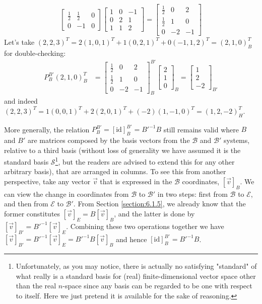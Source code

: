 \begin{solution}
\begin{align*}
\begin{bmatrix}
\frac{1}{2} & \frac{1}{2} & 0 \\
0 & -1 & 0
\end{bmatrix}
\begin{bmatrix}
1 & 0 & -1\\
0 & 2 & 1 \\
1 & 1 & 2
\end{bmatrix}
=
\begin{bmatrix}
\frac{1}{2} & 0 & 2 \\
\frac{1}{2} & 1 & 0 \\
0 & -2 & -1
\end{bmatrix}
\end{align*}
Let's take $(2,2,3)^T = 2(1,0,1)^T + 1(0,2,1)^T + 0(-1,1,2)^T = (2,1,0)^T_B$ for double-checking:
\begin{align*}
P_B^{B'}(2,1,0)^T_B &= 
\begin{bmatrix}
\frac{1}{2} & 0 & 2 \\
\frac{1}{2} & 1 & 0 \\
0 & -2 & -1
\end{bmatrix}_B^{B'}
\begin{bmatrix}
2 \\
1 \\
0
\end{bmatrix}_B
=
\begin{bmatrix}
1 \\
2 \\
-2
\end{bmatrix}_{B'}
\end{align*}
and indeed $(2,2,3)^T = 1(0,0,1)^T + 2(2,0,1)^T + (-2)(1,-1,0)^T = (1,2,-2)^T_H$.
\end{solution}
More generally, the relation $P_B^{B'} = [\text{id}]_B^{B'} = B'^{-1}B$ still remains valid where $B$ and $B'$ are matrices composed by the basis vectors from the $\mathcal{B}$ and $\mathcal{B}'$ systems, relative to a third basis (without loss of generality we have assumed it is the standard basis $\mathcal{S}$\footnote{Unfortunately, as you may notice, there is actually no satisfying "standard" of what really is a standard basis for (real) finite-dimensional vector space other than the real $n$-space since any basis can be regarded to be one with respect to itself. Here we just pretend it is available for the sake of reasoning.}, but the readers are advised to extend this for any other arbitrary basis), that are arranged in columns. To see this from another perspective, take any vector $\vec{v}$ that is expressed in the $\mathcal{B}$ coordinates, $[\vec{v}]_B$. We can view the change in coordinates from $\mathcal{B}$ to $\mathcal{B}'$ in two steps: first from $\mathcal{B}$ to $\mathcal{E}$, and then from $\mathcal{E}$ to $\mathcal{B}'$. From Section \ref{section:6.1.5}, we already know that the former constitutes $[\vec{v}]_E = B[\vec{v}]_B$, and the latter is done by $[\vec{v}]_{B'} = B'^{-1}[\vec{v}]_E$. Combining these two operations together we have $[\vec{v}]_{B'} = B'^{-1}[\vec{v}]_E = B'^{-1}B[\vec{v}]_B$ and hence $[\text{id}]_B^{B'} = B'^{-1}B$.

